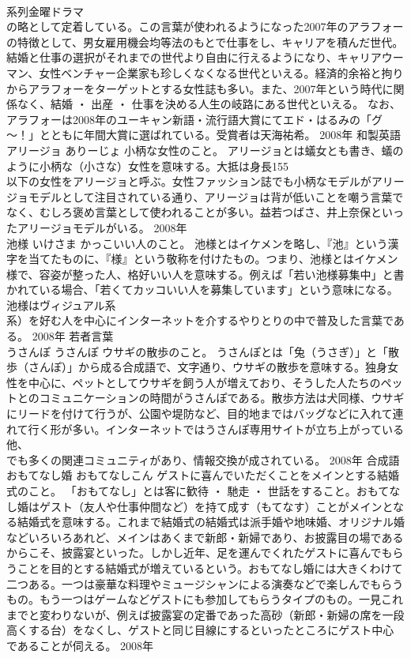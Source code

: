 \documentclass[8pt]{extreport}
\begin{document}
\begin{CJK}{UTF8}{min}
\\	系列金曜ドラマ
\\	の略として定着している。この言葉が使われるようになった2007年のアラフォーの特徴として、男女雇用機会均等法のもとで仕事をし、キャリアを積んだ世代。結婚と仕事の選択がそれまでの世代より自由に行えるようになり、キャリアウーマン、女性ベンチャー企業家も珍しくなくなる世代といえる。経済的余裕と拘りからアラフォーをターゲットとする女性誌も多い。また、2007年という時代に関係なく、結婚 ・ 出産 ・ 仕事を決める人生の岐路にある世代といえる。 なお、アラフォーは2008年のユーキャン新語・流行語大賞にてエド・はるみの「グ～！」とともに年間大賞に選ばれている。受賞者は天海祐希。	2008年	和製英語	
\\	アリージョ	ありーじょ	小柄な女性のこと。	アリージョとは蟻女とも書き、蟻のように小柄な（小さな）女性を意味する。大抵は身長155
\\	以下の女性をアリージョと呼ぶ。女性ファッション誌でも小柄なモデルがアリージョモデルとして注目されている通り、アリージョは背が低いことを嘲う言葉でなく、むしろ褒め言葉として使われることが多い。益若つばさ、井上奈保といったアリージョモデルがいる。	2008年	
\\	池様	いけさま	かっこいい人のこと。	池様とはイケメンを略し、『池』という漢字を当てたものに、『様』という敬称を付けたもの。つまり、池様とはイケメン様で、容姿が整った人、格好いい人を意味する。例えば「若い池様募集中」と書かれている場合、「若くてカッコいい人を募集しています」という意味になる。池様はヴィジュアル系
\\	系）を好む人を中心にインターネットを介するやりとりの中で普及した言葉である。	2008年	若者言葉	
\\	うさんぽ	うさんぽ	ウサギの散歩のこと。	うさんぽとは「兔（うさぎ）」と「散歩（さんぽ）」から成る合成語で、文字通り、ウサギの散歩を意味する。独身女性を中心に、ペットとしてウサギを飼う人が増えており、そうした人たちのペットとのコミュニケーションの時間がうさんぽである。散歩方法は犬同様、ウサギにリードを付けて行うが、公園や堤防など、目的地まではバッグなどに入れて連れて行く形が多い。インターネットではうさんぽ専用サイトが立ち上がっている他、
\\	でも多くの関連コミュニティがあり、情報交換が成されている。	2008年	合成語	
\\	おもてなし婚	おもてなしこん	ゲストに喜んでいただくことをメインとする結婚式のこと。	「おもてなし」とは客に歓待 ・ 馳走 ・ 世話をすること。おもてなし婚はゲスト（友人や仕事仲間など）を持て成す（もてなす）ことがメインとなる結婚式を意味する。これまで結婚式の結婚式は派手婚や地味婚、オリジナル婚などいろいろあれど、メインはあくまで新郎・新婦であり、お披露目の場であるからこそ、披露宴といった。しかし近年、足を運んでくれたゲストに喜んでもらうことを目的とする結婚式が増えているという。おもてなし婚には大きくわけて二つある。一つは豪華な料理やミュージシャンによる演奏などで楽しんでもらうもの。もう一つはゲームなどゲストにも参加してもらうタイプのもの。一見これまでと変わりないが、例えば披露宴の定番であった高砂（新郎・新婦の席を一段高くする台）をなくし、ゲストと同じ目線にするといったところにゲスト中心であることが伺える。	2008年	

\end{CJK}
\end{document}
